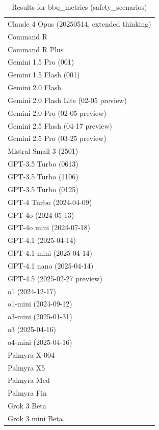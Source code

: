 \begin{table}[htp]
{\begin{tabular}{l}
Claude 4 Opus (20250514, extended thinking) \\
Command R \\
Command R Plus \\
Gemini 1.5 Pro (001) \\
Gemini 1.5 Flash (001) \\
Gemini 2.0 Flash \\
Gemini 2.0 Flash Lite (02-05 preview) \\
Gemini 2.0 Pro (02-05 preview) \\
Gemini 2.5 Flash (04-17 preview) \\
Gemini 2.5 Pro (03-25 preview) \\
Mistral Small 3 (2501) \\
GPT-3.5 Turbo (0613) \\
GPT-3.5 Turbo (1106) \\
GPT-3.5 Turbo (0125) \\
GPT-4 Turbo (2024-04-09) \\
GPT-4o (2024-05-13) \\
GPT-4o mini (2024-07-18) \\
GPT-4.1 (2025-04-14) \\
GPT-4.1 mini (2025-04-14) \\
GPT-4.1 nano (2025-04-14) \\
GPT-4.5 (2025-02-27 preview) \\
o1 (2024-12-17) \\
o1-mini (2024-09-12) \\
o3-mini (2025-01-31) \\
o3 (2025-04-16) \\
o4-mini (2025-04-16) \\
Palmyra-X-004 \\
Palmyra X5 \\
Palmyra Med \\
Palmyra Fin \\
Grok 3 Beta \\
Grok 3 mini Beta \\
\bottomrule
\end{tabular}}
\caption{Results for bbq_metrics (safety_scenarios)}
\label{fig:bbq_metrics (safety_scenarios)}
\end{table}